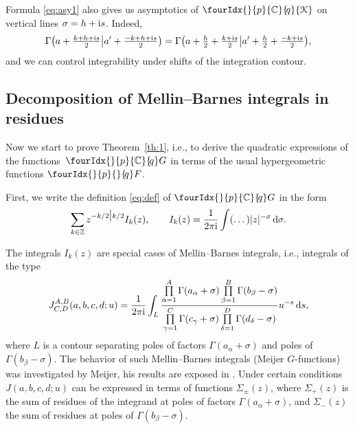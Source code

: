 \documentclass[pdftex]{sigma}
\numberwithin{equation}{section}
\newcommand{\hyp}[2]{\fourIdx{}{#1}{}{\!#2}F}
\newcommand{\Kc}[2]{\fourIdx{}{#1}{\C}{\!#2}{\EuScript K}}
\newcommand{\Gc}[2]{\fourIdx{}{#1}{\C}{\!#2}G}
\def\C {{\mathbb C }}
\def\Z{{\mathbb Z}}
\begin{document}
\begin{Remark}
Formula \eqref{eq:asy1} also gives us asymptotics of
$\Kc{p}{q}$ on vertical lines $\sigma=h+{\rm i}s$. Indeed,
\[
\Gamma\big(a+\tfrac{k+h+{\rm i}s}{2}\big|a'+\tfrac{-k+h+{\rm i}s}{2}\big)=
\Gamma\big(a+\tfrac h2+\tfrac{k+{\rm i}s}{2}\big|a'+\tfrac h2+\tfrac{-k+{\rm i}s}{2}\big),
\]
and we can control integrability under shifts of the integration contour.
\end{Remark}

\subsection{Decomposition of Mellin--Barnes integrals in residues}\label{ss:meijer}
Now we start to prove Theorem~\ref{th:1}, i.e., to derive
the quadratic expressions of the func\-tions~$\Gc{p}{q}$ in terms of
the usual hypergeometric functions $\hyp{p}{q}$.

First, we write the definition \eqref{eq:def} of $\Gc{p}{q}$ in the form
\[
\sum_{k\in \Z} z^{-k/2\big|k/2} I_k(z), \qquad
I_k(z)=\frac{1}{2\pi {\rm i}}\int (\dots)|z|^{-\sigma}\,{\rm d}\sigma.
\]

The integrals $I_k(z)$ are special cases of
Mellin--Barnes integrals, i.e., integrals of the type
\begin{equation}
J^{A,B}_{C,D}(a,b,c,d;u)=\frac 1{2\pi {\rm i}}\int_L \frac{\prod\limits_{\alpha=1}^A\Gamma(a_\alpha+\sigma)
\prod\limits_{\beta=1}^B\Gamma(b_\beta-\sigma)}
{\prod\limits_{\gamma=1}^C\Gamma(c_\gamma+\sigma)\prod\limits_{\delta=1}^D\Gamma(d_\delta-\sigma)} u^{-s}
\, {\rm d}s,
\label{eq:J}
\end{equation}
where $L$ is a contour separating poles of factors
$\Gamma(a_\alpha+\sigma)$ and poles of $\Gamma(b_\beta-\sigma)$.
The behavior of such Mellin--Barnes integrals
(Meijer $G$-functions) was investigated by Meijer,
his results are exposed in \cite{BW, Luke,Mar}.
Under certain conditions $J(a,b,c,d;u)$ can be expressed in terms
of functions $\Sigma_\pm(z)$, where
$\Sigma_+(z)$ is the sum of residues of the integrand at poles of
factors $\Gamma(a_\alpha+\sigma)$, and $\Sigma_-(z)$
the sum of residues at poles of $\Gamma(b_\beta-\sigma)$.
\end{document}
